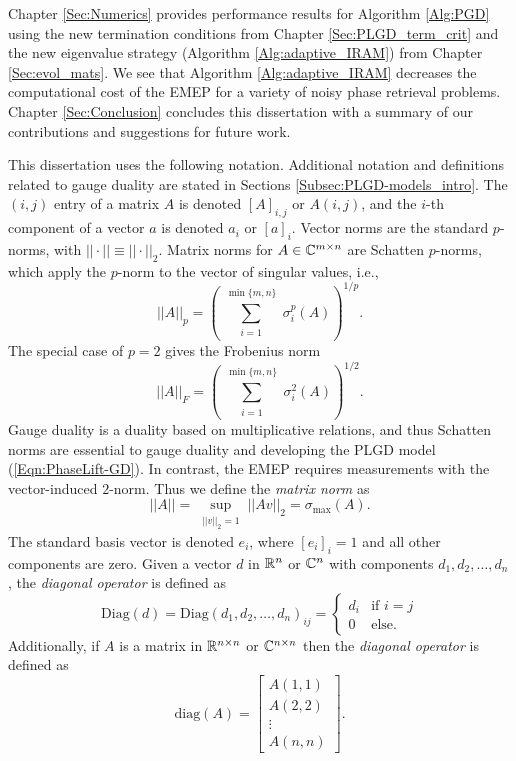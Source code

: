 Chapter \ref{Sec:Numerics} provides performance results for Algorithm \ref{Alg:PGD} using the new termination conditions from Chapter \ref{Sec:PLGD_term_crit} and the new eigenvalue strategy (Algorithm \ref{Alg:adaptive_IRAM}) from Chapter \ref{Sec:evol_mats}.
We see that Algorithm \ref{Alg:adaptive_IRAM} decreases the computational cost of the EMEP for a variety of noisy phase retrieval problems.
Chapter \ref{Sec:Conclusion} concludes this dissertation with a summary of our contributions and suggestions for future work.



This dissertation uses the following notation.  Additional notation and definitions related to gauge duality are stated in Sections \ref{Subsec:PLGD-models_intro}.  The $(i,j)$ entry of a matrix $A$ is denoted $[A]_{i,j}$ or $A(i,j)$, and the $i$-th component of a vector $a$ is denoted $a_i$ or $[a]_i$.  Vector norms are the standard $p$-norms, with $||\cdot|| \equiv || \cdot ||_2$.   Matrix norms for $A \in {\mathbb C}^{m \times n}$ are Schatten $p$-norms, which apply the  $p$-norm to the vector of singular values, i.e.,
\begin{equation}  \label{Def:shatten_norms}
||A||_p  = \left( \sum_{\substack{i = 1}}^{\substack{\min\{m, n \}}} \sigma_i^p(A) \right)^{1/p}.
\end{equation}
The special case of $p = 2$ gives the Frobenius norm
\begin{equation} 	\label{Def:Frobenius_norm}
||A||_F = \left(   \sum_{\substack{i = 1}}^{\substack{\min\{m, n \}}} \sigma_i^2(A)  \right)^{1/2}.
\end{equation}
Gauge duality is a duality based on multiplicative relations, and thus Schatten norms are essential to gauge duality and developing the PLGD model (\ref{Eqn:PhaseLift-GD}).  In contrast, the EMEP requires measurements with the vector-induced $2$-norm.  Thus we define the \textit{matrix norm} as
\begin{equation} 		\label{Def:matrix_norm}
||A|| = \sup_{\substack{||v||_2 = 1}} ||Av||_2 = \sigma_{\max}(A).
\end{equation}
The standard basis vector is denoted $e_i$, where $[e_i]_i = 1$ and all other components are zero.  
Given a vector $d$ in ${\mathbb R}^n$ or ${\mathbb C}^n$ with components $d_1, d_2, \ldots, d_n$, the \textit{diagonal operator} is defined as
\begin{equation}
\text{Diag}(d) = \text{Diag}(d_1, d_2, \ldots, d_n)_{ij} = 
	\begin{cases}
		d_i 		&		\text{if } i = j	\\
		0		&	\text{else}.
	\end{cases}
\end{equation}
Additionally, if $A$ is a matrix in ${\mathbb R}^{n \times n}$ or ${\mathbb C}^{n \times n}$ then the \textit{diagonal operator} is defined as
\begin{equation}
\text{diag}(A) = 
	\begin{bmatrix}
		A(1,1)	\\
		A(2,2)	\\
		\vdots	\\
		A(n,n)
	\end{bmatrix}.
\end{equation}

